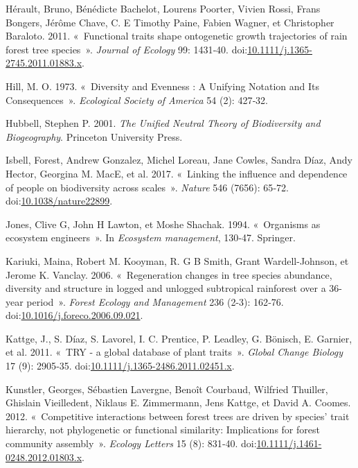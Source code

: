 \documentclass[11pt,french,A4paper,extrafontsizes,onecolumn,openright]{memoir}
\begin{document}
\hypertarget{ref-Herault2011}{}
Hérault, Bruno, Bénédicte Bachelot, Lourens Poorter, Vivien Rossi, Frans
Bongers, Jérôme Chave, C. E Timothy Paine, Fabien Wagner, et Christopher
Baraloto. 2011. «~Functional traits shape ontogenetic growth
trajectories of rain forest tree species~». \emph{Journal of Ecology}
99: 1431‑40.
doi:\href{https://doi.org/10.1111/j.1365-2745.2011.01883.x}{10.1111/j.1365-2745.2011.01883.x}.

\hypertarget{ref-Hill1973}{}
Hill, M. O. 1973. «~Diversity and Evenness : A Unifying Notation and Its
Consequences~». \emph{Ecological Society of America} 54 (2): 427‑32.

\hypertarget{ref-Hubbell2001}{}
Hubbell, Stephen P. 2001. \emph{The Unified Neutral Theory of
Biodiversity and Biogeography}. Princeton University Press.

\hypertarget{ref-Isbell2017}{}
Isbell, Forest, Andrew Gonzalez, Michel Loreau, Jane Cowles, Sandra
Díaz, Andy Hector, Georgina M. MacE, et al. 2017. «~Linking the
influence and dependence of people on biodiversity across scales~».
\emph{Nature} 546 (7656): 65‑72.
doi:\href{https://doi.org/10.1038/nature22899}{10.1038/nature22899}.

\hypertarget{ref-Jones1994}{}
Jones, Clive G, John H Lawton, et Moshe Shachak. 1994. «~Organisms as
ecosystem engineers~». In \emph{Ecosystem management}, 130‑47. Springer.

\hypertarget{ref-Kariuki2006a}{}
Kariuki, Maina, Robert M. Kooyman, R. G B Smith, Grant Wardell-Johnson,
et Jerome K. Vanclay. 2006. «~Regeneration changes in tree species
abundance, diversity and structure in logged and unlogged subtropical
rainforest over a 36-year period~». \emph{Forest Ecology and Management}
236 (2-3): 162‑76.
doi:\href{https://doi.org/10.1016/j.foreco.2006.09.021}{10.1016/j.foreco.2006.09.021}.

\hypertarget{ref-Kattge2011}{}
Kattge, J., S. Díaz, S. Lavorel, I. C. Prentice, P. Leadley, G. Bönisch,
E. Garnier, et al. 2011. «~TRY - a global database of plant traits~».
\emph{Global Change Biology} 17 (9): 2905‑35.
doi:\href{https://doi.org/10.1111/j.1365-2486.2011.02451.x}{10.1111/j.1365-2486.2011.02451.x}.

\hypertarget{ref-Kunstler2012}{}
Kunstler, Georges, Sébastien Lavergne, Benoît Courbaud, Wilfried
Thuiller, Ghislain Vieilledent, Niklaus E. Zimmermann, Jens Kattge, et
David A. Coomes. 2012. «~Competitive interactions between forest trees
are driven by species' trait hierarchy, not phylogenetic or functional
similarity: Implications for forest community assembly~». \emph{Ecology
Letters} 15 (8): 831‑40.
doi:\href{https://doi.org/10.1111/j.1461-0248.2012.01803.x}{10.1111/j.1461-0248.2012.01803.x}.
\end{document}
